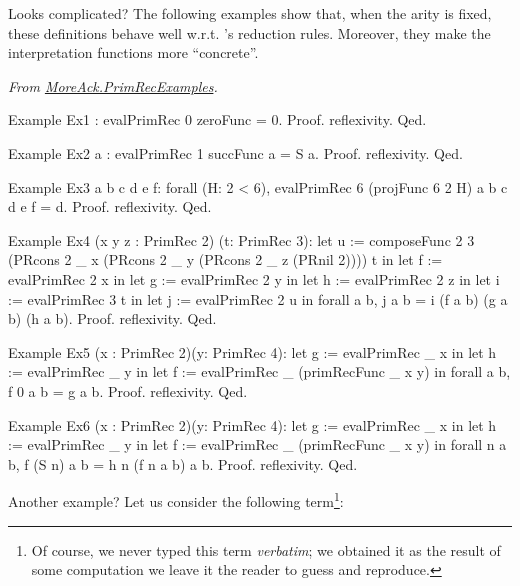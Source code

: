 Looks complicated? The following examples show that, when
the arity is fixed, these definitions behave well w.r.t. 
\coq's reduction rules. Moreover, they make the interpretation functions more ``concrete''.

\vspace{4pt}
\noindent
\emph{From \href{../theories/html/hydras.MoreAck.PrimRecExamples.html}{MoreAck.PrimRecExamples}.}
\begin{Coqsrc}
Example Ex1 : evalPrimRec 0 zeroFunc = 0.
Proof. reflexivity. Qed.

Example Ex2 a : evalPrimRec 1 succFunc a = S a.
Proof. reflexivity. Qed.

Example Ex3 a b c d e f: forall (H: 2 < 6),
    evalPrimRec 6
                (projFunc 6 2 H) a b c d e f = d.
Proof. reflexivity. Qed.

Example Ex4 (x y z : PrimRec 2) (t: PrimRec 3):
  let u := composeFunc 2 3
                       (PRcons 2 _ x
                               (PRcons 2 _ y
                                       (PRcons 2 _ z
                                               (PRnil 2))))
                       t in
  let f := evalPrimRec 2 x in
  let g := evalPrimRec 2 y in
  let h := evalPrimRec 2 z in
  let i := evalPrimRec 3 t in
  let j := evalPrimRec 2 u in
  forall a b, j a b = i (f a b) (g a b) (h a b).
Proof. reflexivity. Qed.

Example Ex5 (x : PrimRec 2)(y: PrimRec 4):
  let g := evalPrimRec _ x in
  let h := evalPrimRec _ y in
  let f := evalPrimRec _ (primRecFunc _ x y) in
  forall a b,  f 0 a b = g a b.
Proof. reflexivity.   Qed.                          

Example Ex6 (x : PrimRec 2)(y: PrimRec 4):
  let g := evalPrimRec _ x in
  let h := evalPrimRec _ y in
  let f := evalPrimRec _ (primRecFunc _ x y) in
  forall n a b,  f (S n) a b = h n (f n a b) a b.
Proof. reflexivity.   Qed.                          
\end{Coqsrc}


Another example?
Let us consider the following term\footnote{Of course, we never typed this term \emph{verbatim}; we obtained it as the result of some computation we leave it the reader to guess and reproduce.}:

